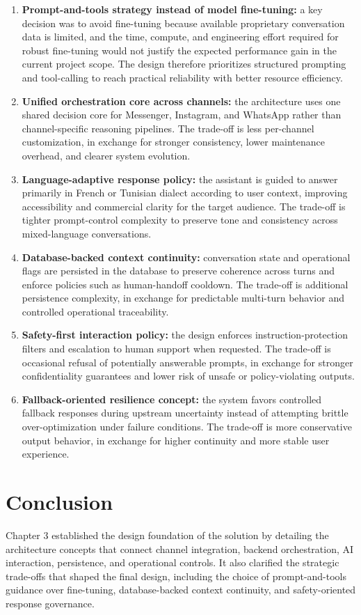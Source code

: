 \begin{enumerate}
    \item \textbf{Prompt-and-tools strategy instead of model fine-tuning:} a key decision was to avoid fine-tuning because available proprietary conversation data is limited, and the time, compute, and engineering effort required for robust fine-tuning would not justify the expected performance gain in the current project scope. The design therefore prioritizes structured prompting and tool-calling to reach practical reliability with better resource efficiency\cite{liu2023prompting_survey}.
    \item \textbf{Unified orchestration core across channels:} the architecture uses one shared decision core for Messenger, Instagram, and WhatsApp rather than channel-specific reasoning pipelines. The trade-off is less per-channel customization, in exchange for stronger consistency, lower maintenance overhead, and clearer system evolution.
    \item \textbf{Language-adaptive response policy:} the assistant is guided to answer primarily in French or Tunisian dialect according to user context, improving accessibility and commercial clarity for the target audience. The trade-off is tighter prompt-control complexity to preserve tone and consistency across mixed-language conversations.
    \item \textbf{Database-backed context continuity:} conversation state and operational flags are persisted in the database to preserve coherence across turns and enforce policies such as human-handoff cooldown. The trade-off is additional persistence complexity, in exchange for predictable multi-turn behavior and controlled operational traceability.
    \item \textbf{Safety-first interaction policy:} the design enforces instruction-protection filters and escalation to human support when requested. The trade-off is occasional refusal of potentially answerable prompts, in exchange for stronger confidentiality guarantees and lower risk of unsafe or policy-violating outputs.
    \item \textbf{Fallback-oriented resilience concept:} the system favors controlled fallback responses during upstream uncertainty instead of attempting brittle over-optimization under failure conditions. The trade-off is more conservative output behavior, in exchange for higher continuity and more stable user experience.
\end{enumerate}

\section{Conclusion}
Chapter 3 established the design foundation of the solution by detailing the architecture concepts that connect channel integration, backend orchestration, AI interaction, persistence, and operational controls. It also clarified the strategic trade-offs that shaped the final design, including the choice of prompt-and-tools guidance over fine-tuning, database-backed context continuity, and safety-oriented response governance.

